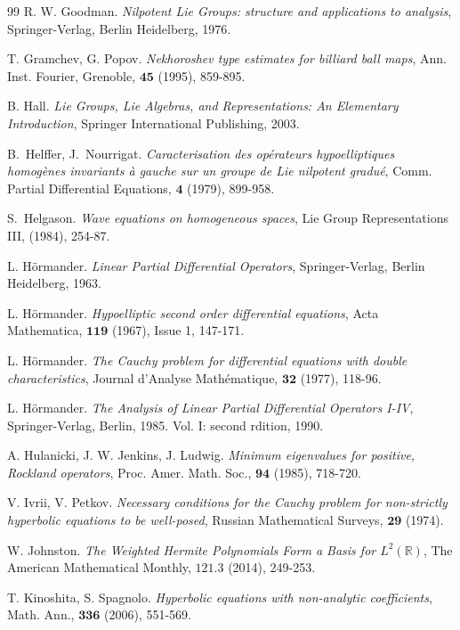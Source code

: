 \documentclass[12pt,oneside,a4paper]{book}
\numberwithin{equation}{section}     %
\theoremstyle{plain}
\theoremstyle{definition}
\newcommand{\R}{{\mathbb R}}
\begin{document}
\begin{thebibliography}{99}
	R. W. Goodman.
	\emph{Nilpotent Lie Groups: structure and applications to analysis},
	Springer-Verlag, Berlin Heidelberg, 1976.
	
	T. Gramchev, G. Popov.
	\emph{Nekhoroshev type estimates for billiard ball maps},
	Ann. Inst. Fourier, Grenoble, $\mathbf{45}$ (1995), 859-895. 
	
	
	B. Hall.
	\emph{Lie Groups, Lie Algebras, and Representations: An Elementary Introduction},
	Springer International Publishing,
	2003.
	
	
	B.~Helffer, J.~Nourrigat.
	\emph{Caracterisation des op\'erateurs hypoelliptiques homog\`enes invariants \`a gauche sur un groupe de {L}ie nilpotent gradu\'e},
	Comm. Partial Differential Equations, $\mathbf{4}$ (1979), 899-958. 
	
	S.~Helgason.
	\emph{Wave equations on homogeneous spaces},
	Lie Group Representations III, (1984), 254-87.
	
	L. H\"ormander.
	\emph{Linear Partial Differential Operators},
	Springer-Verlag, Berlin Heidelberg, 1963.
	
	L. H\"ormander.
	\emph{Hypoelliptic second order differential equations},
	Acta Mathematica, $\mathbf{119}$ (1967), Issue 1, 147-171.
	
	L. Hörmander. 
	\emph{The Cauchy problem for differential equations with double characteristics}, 
	Journal d’Analyse Mathématique, $\mathbf{32}$ (1977), 118-96.
	
	L. H\"ormander.
	\emph{The Analysis of Linear Partial Differential Operators I-IV},
	Springer-Verlag, Berlin, 1985. Vol. I: second rdition, 1990.
	
	 A. Hulanicki, J. W. Jenkins, J. Ludwig.
	\emph{Minimum eigenvalues for positive, Rockland operators},
	Proc. Amer. Math. Soc., $\mathbf{94}$ (1985), 718-720.
	
	V. Ivrii, V. Petkov. 
	\emph{Necessary conditions for the Cauchy problem for non-strictly hyperbolic equations to be well-posed}, Russian Mathematical Surveys, $\mathbf{29}$ (1974).
	
	W. Johnston.
	\emph{The Weighted Hermite Polynomials Form a Basis for $L^2(\R)$},
	The American Mathematical Monthly, $\mathbf{121.3}$ (2014), 249-253.
	
	T. Kinoshita, S. Spagnolo.
	\emph{Hyperbolic equations with non-analytic coefficients},
	Math. Ann., $\mathbf{336}$ (2006), 551-569.
	

\end{thebibliography}
\end{document}

